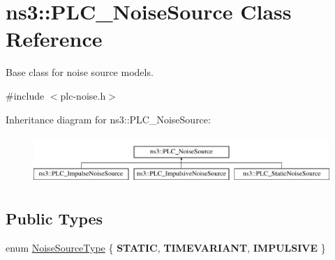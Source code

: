 \hypertarget{classns3_1_1PLC__NoiseSource}{\section{ns3\-:\-:\-P\-L\-C\-\_\-\-Noise\-Source \-Class \-Reference}
\label{classns3_1_1PLC__NoiseSource}
}


\-Base class for noise source models.  




{\ttfamily \#include $<$plc-\/noise.\-h$>$}

\-Inheritance diagram for ns3\-:\-:\-P\-L\-C\-\_\-\-Noise\-Source\-:\begin{figure}[H]
\begin{center}
\leavevmode
\includegraphics[height=1.848185cm]{classns3_1_1PLC__NoiseSource}
\end{center}
\end{figure}
\subsection*{\-Public \-Types}
\begin{DoxyCompactItemize}
\item 
enum \hyperlink{classns3_1_1PLC__NoiseSource_a3f5751ed7e0ffe2f0c9ad37d2c75ff2b}{\-Noise\-Source\-Type} \{ {\bfseries \-S\-T\-A\-T\-I\-C}, 
{\bfseries \-T\-I\-M\-E\-V\-A\-R\-I\-A\-N\-T}, 
{\bfseries \-I\-M\-P\-U\-L\-S\-I\-V\-E}
 \}
\end{DoxyCompactItemize}
